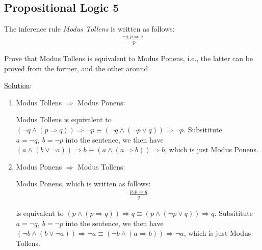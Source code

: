 \documentclass[11pt, answers]{exam}
\begin{document}
%
%
\begin{questions}
\section{Propositional Logic 5}
\question

The inference rule \textit{Modus Tollens} is written as follows:
\begin{align*}
	\frac{\neg q, p \Rightarrow q}{\neg p}
\end{align*}

Prove that Modus Tollens is equivalent to Modus Ponens, i.e., the latter can be proved from the former, and the other around.

\underline{Solution}: 
\begin{enumerate}
	\item Modus Tollens $\Rightarrow$ Modus Ponens: 
	
	Modus Tollens is equivalent to $(\neg q \wedge (p \Rightarrow q)) \Rightarrow \neg p \equiv (\neg q \wedge (\neg p \vee q)) \Rightarrow \neg p$. Subsititute $a = \neg q, \ b = \neg p$ into the sentence, we then have $(a \wedge (b \vee \neg a)) \Rightarrow b \equiv (a \wedge (a \Rightarrow b)) \Rightarrow b$, which is just Modus Ponens.
	\item Modus Ponens $\Rightarrow$ Modus Tollens: 
	
	Modus Ponens, which is written as follows:
	\begin{align*}
	\frac{p, p \Rightarrow q}{q}
	\end{align*}
	
	is equivalent to $(p \wedge (p \Rightarrow q)) \Rightarrow q \equiv (p \wedge (\neg p \vee q)) \Rightarrow q$. Subsititute $a = \neg q, \ b = \neg p$ into the sentence, we then have $(\neg b \wedge (b \vee \neg a)) \Rightarrow \neg a \equiv (\neg b \wedge (a\Rightarrow b)) \Rightarrow \neg a$, which is just Modus Tollens.
	
\end{enumerate}

\end{questions}
\end{document}
